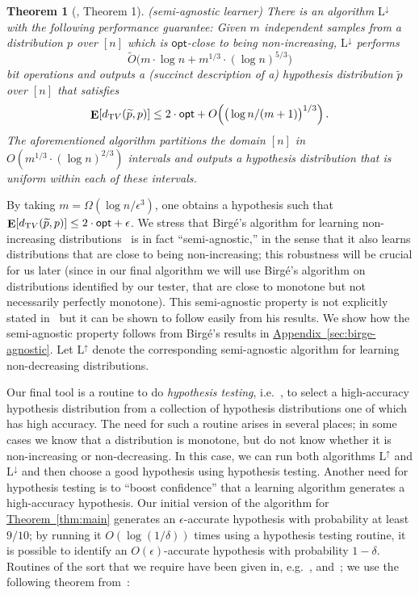 \documentclass[10pt]{article}
\newtheorem{theorem}{Theorem}[section]
\theoremstyle{definition}
\providecommand{\eg}{e.g.\ }
\providecommand{\ie}{i.e.\ }
\numberwithin{equation}{section}
\newcommand{\expref}[2]{\texorpdfstring{\hyperref[#2]{#1~\ref{#2}}}{#1~\ref{#2}}}
\DeclareMathOperator*{\E}{{\bf E}}
\newcommand{\dtv}{d_{\mathrm TV}}
\newcommand{\eps}{\epsilon}
\newcommand{\opt}{\mathsf{opt}}
\newcommand{\AND}{{\mathrm{L^{\uparrow}}}}
\newcommand{\ANI}{{\mathrm{L^{\downarrow}}}}
\begin{document}
\begin{theorem}[\cite{Birge:87b}, Theorem 1] \label{thm:birge-monotone}
(semi-agnostic learner) \label{thm:agnostic-monotone-learner}
There is an algorithm $\ANI$ with the following performance guarantee: Given
$m$ independent samples from a distribution $p$  over $[n]$ which is $\opt$-close to being non-increasing,
$\ANI$ performs
\[
\tilde{O}\bigl( m \cdot \log n + m^{1/3} \cdot (\log n)^{5/3}\bigr)
\]
bit operations
and outputs a (succinct description of a) hypothesis distribution $\widetilde{p}$ over $[n]$ that satisfies
$$\E[\dtv(\widetilde{p},p)] \leq 2 \cdot \opt + O\Big(\big(\log n/(m+1)\big)^{1/3}\Big)\,.$$
The aforementioned algorithm partitions the domain $[n]$
in $O(m^{1/3} \cdot (\log n)^{2/3})$ intervals and outputs a hypothesis distribution
that is uniform within each of these intervals.
\end{theorem}

By taking $m = \Omega (\log n / \eps^3)$, one obtains a hypothesis such that
$\E[\dtv(\widetilde{p},p)] \leq 2 \cdot \opt + \eps$.
We stress that Birg\'{e}'s algorithm for learning non-increasing distributions~\cite{Birge:87b}
is in fact ``semi-agnostic,'' in the sense that it also learns distributions that are close
to being non-increasing; this robustness will be crucial for us later (since in our final
algorithm we will use Birg\'{e}'s algorithm on distributions identified
by our tester, that are close to monotone but not necessarily perfectly
monotone). This semi-agnostic property is not explicitly stated in~\cite{Birge:87b}
but it can be shown to follow easily from his results. We show how
the semi-agnostic property follows from Birg\'{e}'s results in
\expref{Appendix}{sec:birge-agnostic}.
Let $\AND$ denote the corresponding semi-agnostic algorithm for learning non-decreasing distributions.

Our final tool is a routine to do \emph{hypothesis testing}, \ie, to select a
high-accuracy hypothesis distribution from a collection of hypothesis distributions one
of which has high accuracy.  The need for such a routine arises in several places; in
some cases we know that a distribution is monotone, but do not know whether it is
non-increasing or non-decreasing. In this case, we can run both algorithms $\AND$ and
$\ANI$ and then choose a good hypothesis using hypothesis testing.  Another need for
hypothesis testing is to ``boost confidence'' that a learning algorithm generates a
high-accuracy hypothesis.  Our initial version of the algorithm for
\expref{Theorem}{thm:main} generates an $\eps$-accurate hypothesis with probability at least
$9/10$; by running it $O(\log(1/\delta))$ times using a hypothesis testing
routine,
it is possible to identify an $O(\eps)$-accurate hypothesis with probability $1-\delta$.
Routines of the sort that we require have been given in, \eg, \cite{DL:01} and~\cite{DDS12stoclong}; we use the following theorem from~\cite{DDS12stoclong}:
\end{document}
